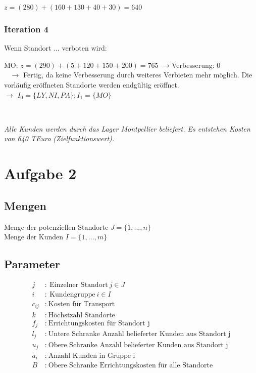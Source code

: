 \documentclass[a4paper,11pt]{article}
\begin{document}
$z = (280) + (160 + 130 + 40 + 30) = 640$ \\

\subsubsection*{Iteration 4}
Wenn Standort ... verboten wird: \newline

MO: $z = (290) + (5 + 120 + 150 + 200) = 765$ $\to$Verbesserung: 0 \\
~\newline
$\longrightarrow$ Fertig, da keine Verbesserung durch weiteres Verbieten mehr möglich. Die vorläufig eröffneten Standorte werden endgültig eröffnet. \\
$\longrightarrow$ $I_0 = \{LY, NI, PA\}; I_1 = \{MO\}$

~\newline

\textit{Alle Kunden werden durch das Lager Montpellier beliefert. Es entstehen Kosten von 640 TEuro (Zielfunktionswert).} \\

\section*{Aufgabe 2}
\subsection*{Mengen}
Menge der potenziellen Standorte $J=\{1,...,n\}$ \\
Menge der Kunden $I=\{1,...,m\}$ \\

\subsection*{Parameter}
\begin{align*}
    j &: ~\text{Einzelner Standort} ~ j \in J \\
    i &: ~\text{Kundengruppe} ~ i \in I \\
    c_{ij} &: ~\text{Kosten für Transport} \\
    k &: ~\text{Höchstzahl Standorte} \\
    f_j &: ~\text{Errichtungskosten für Standort j} \\
    l_j &: ~\text{Untere Schranke Anzahl belieferter Kunden aus Standort j} \\
    u_j &: ~\text{Obere Schranke Anzahl belieferter Kunden aus Standort j} \\
    a_i &: ~\text{Anzahl Kunden in Gruppe i} \\
    B &: ~\text{Obere Schranke Errichtungskosten für alle Standorte} \\
\end{align*}
\end{document}
